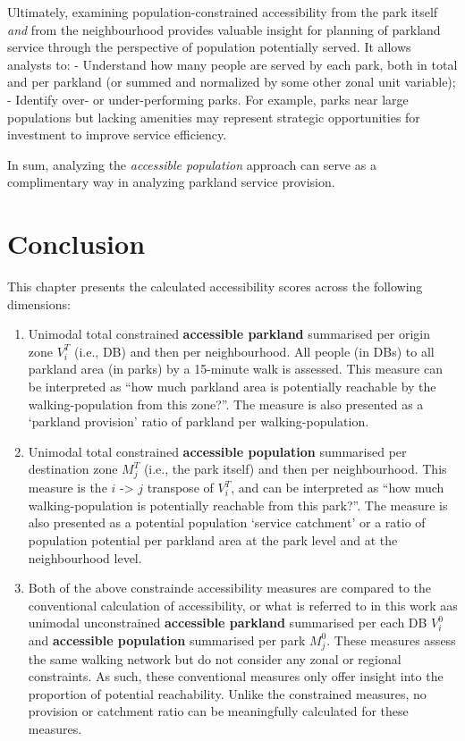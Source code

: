 \documentclass[
11pt, %
oneside, %
english, %
singlespacing, %
]{macthesis} %
\def\tightlist{}
\begin{document}
Ultimately, examining population-constrained accessibility from the park itself \emph{and} from the neighbourhood provides valuable insight for planning of parkland service through the perspective of population potentially served. It allows analysts to:
- Understand how many people are served by each park, both in total and per parkland (or summed and normalized by some other zonal unit variable);
- Identify over- or under-performing parks. For example, parks near large populations but lacking amenities may represent strategic opportunities for investment to improve service efficiency.

In sum, analyzing the \emph{accessible population} approach can serve as a complimentary way in analyzing parkland service provision.

\section{Conclusion}\label{conclusion}

This chapter presents the calculated accessibility scores across the following dimensions:

\begin{enumerate}
\def\labelenumi{\arabic{enumi}.}
\tightlist
\item
  Unimodal total constrained \textbf{accessible parkland} summarised per origin zone \(V_i^T\) (i.e., DB) and then per neighbourhood. All people (in DBs) to all parkland area (in parks) by a 15-minute walk is assessed. This measure can be interpreted as ``how much parkland area is potentially reachable by the walking-population from this zone?''. The measure is also presented as a `parkland provision' ratio of parkland per walking-population.
\item
  Unimodal total constrained \textbf{accessible population} summarised per destination zone \(M_j^T\) (i.e., the park itself) and then per neighbourhood. This measure is the \(i\) -\textgreater{} \(j\) transpose of \(V_i^T\), and can be interpreted as ``how much walking-population is potentially reachable from this park?''. The measure is also presented as a potential population `service catchment' or a ratio of population potential per parkland area at the park level and at the neighbourhood level.
\item
  Both of the above constrainde accessibility measures are compared to the conventional calculation of accessibility, or what is referred to in this work aas unimodal unconstrained \textbf{accessible parkland} summarised per each DB \(V_i^0\) and \textbf{accessible population} summarised per park \(M_j^0\). These measures assess the same walking network but do not consider any zonal or regional constraints. As such, these conventional measures only offer insight into the proportion of potential reachability. Unlike the constrained measures, no provision or catchment ratio can be meaningfully calculated for these measures.
\end{enumerate}
\end{document}
